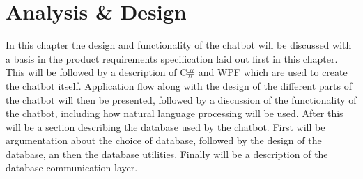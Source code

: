 \chapter{Analysis \& Design}\label{ch:analysis_and_design}

In this chapter the design and functionality of the chatbot will be discussed with a basis in the product requirements specification laid out first in this chapter. This will be followed by a description of C\# and WPF which are used to create the chatbot itself. Application flow along with the design of the different parts of the chatbot will then be presented, followed by a discussion of the functionality of the chatbot, including how natural language processing will be used. After this will be a section describing the database used by the chatbot. First will be argumentation about the choice of database, followed by the design of the database, an then the database utilities. Finally will be a description of the database communication layer. 